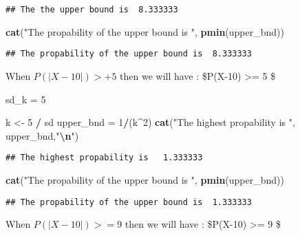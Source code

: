\documentclass[
]{article}
\newenvironment{Shaded}{\begin{snugshade}}{\end{snugshade}}
\newcommand{\DecValTok}[1]{\textcolor[rgb]{0.00,0.00,0.81}{#1}}
\newcommand{\FunctionTok}[1]{\textcolor[rgb]{0.13,0.29,0.53}{\textbf{#1}}}
\newcommand{\NormalTok}[1]{#1}
\newcommand{\OtherTok}[1]{\textcolor[rgb]{0.56,0.35,0.01}{#1}}
\newcommand{\SpecialCharTok}[1]{\textcolor[rgb]{0.81,0.36,0.00}{\textbf{#1}}}
\newcommand{\StringTok}[1]{\textcolor[rgb]{0.31,0.60,0.02}{#1}}
\begin{document}
\begin{verbatim}
## The the upper bound is  8.333333
\end{verbatim}

\begin{Shaded}
\begin{Highlighting}[]
\FunctionTok{cat}\NormalTok{(}\StringTok{"The propability of the upper bound is "}\NormalTok{, }\FunctionTok{pmin}\NormalTok{(upper\_bnd))}
\end{Highlighting}
\end{Shaded}

\begin{verbatim}
## The propability of the upper bound is  8.333333
\end{verbatim}

When \(P(|X-10|) >+ 5\) then we will have : \$P(\textbar X-10\textbar)
\textgreater= 5 \le {} \$

\begin{Shaded}
\begin{Highlighting}[]
\NormalTok{sd\_k  }\OtherTok{=} \DecValTok{5} 

\NormalTok{k }\OtherTok{\textless{}{-}} \DecValTok{5} \SpecialCharTok{/}\NormalTok{ sd}
\NormalTok{upper\_bnd }\OtherTok{=} \DecValTok{1}\SpecialCharTok{/}\NormalTok{(k}\SpecialCharTok{\^{}}\DecValTok{2}\NormalTok{)}
\FunctionTok{cat}\NormalTok{(}\StringTok{"The highest propability is  "}\NormalTok{, upper\_bnd,}\StringTok{"}\SpecialCharTok{\textbackslash{}n}\StringTok{"}\NormalTok{)}
\end{Highlighting}
\end{Shaded}

\begin{verbatim}
## The highest propability is   1.333333
\end{verbatim}

\begin{Shaded}
\begin{Highlighting}[]
\FunctionTok{cat}\NormalTok{(}\StringTok{"The propability of the upper bound is "}\NormalTok{, }\FunctionTok{pmin}\NormalTok{(upper\_bnd))}
\end{Highlighting}
\end{Shaded}

\begin{verbatim}
## The propability of the upper bound is  1.333333
\end{verbatim}

When \(P(|X-10|) >= 9\) then we will have : \$P(\textbar X-10\textbar)
\textgreater= 9 \le {} \$
\end{document}
